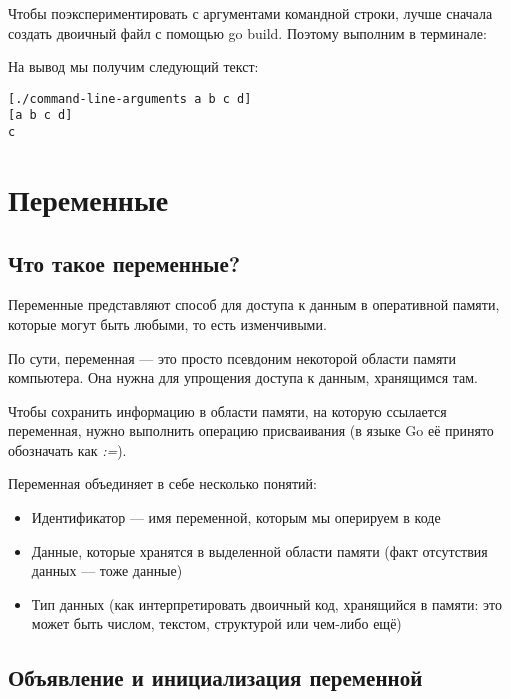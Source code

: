 \documentclass{book}
\begin{document}


Чтобы поэкспериментировать с аргументами командной строки, лучше сначала создать двоичный файл с помощью go build. Поэтому выполним в терминале:


На вывод мы получим следующий текст:
\begin{lstlisting}[style=lststyle:sh]
[./command-line-arguments a b c d]       
[a b c d]
c
\end{lstlisting}

\section{Переменные}
\subsection{Что такое переменные?}

Переменные представляют способ для доступа к данным в оперативной памяти, которые могут быть любыми, то есть изменчивыми.

По сути, переменная --- это просто псевдоним некоторой области памяти компьютера. Она нужна для упрощения доступа к данным, хранящимся там.

Чтобы сохранить информацию в области памяти, на которую ссылается переменная, нужно выполнить операцию присваивания (в языке Go её принято обозначать как \textit{:=}).

Переменная объединяет в себе несколько понятий:
\begin{itemize}
    \item Идентификатор --- имя переменной, которым мы оперируем в коде
    \item Данные, которые хранятся в выделенной области памяти (факт отсутствия данных --- тоже данные)
    \item Тип данных (как интерпретировать двоичный код, хранящийся в памяти: это может быть числом, текстом, структурой или чем-либо ещё)
\end{itemize}

\subsection{Объявление и инициализация переменной}
\end{document}
